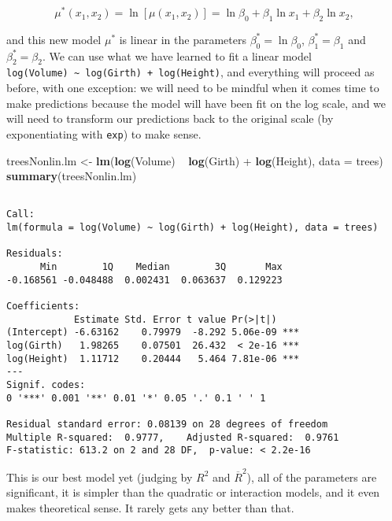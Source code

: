 \documentclass[]{book}
\newenvironment{Shaded}{\begin{snugshade}}{\end{snugshade}}
\newcommand{\KeywordTok}[1]{\textcolor[rgb]{0.13,0.29,0.53}{\textbf{{#1}}}}
\newcommand{\DataTypeTok}[1]{\textcolor[rgb]{0.13,0.29,0.53}{{#1}}}
\newcommand{\StringTok}[1]{\textcolor[rgb]{0.31,0.60,0.02}{{#1}}}
\newcommand{\NormalTok}[1]{{#1}}
\numberwithin{equation}{chapter}
\numberwithin{figure}{chapter}
\theoremstyle{plain}
\theoremstyle{definition}
\theoremstyle{remark}
\theoremstyle{definition}
\theoremstyle{definition}
\theoremstyle{remark}
\begin{document}
\begin{equation}
\mu^{\ast}(x_{1},x_{2})=\ln\left[\mu(x_{1},x_{2})\right]=\ln\beta_{0}+\beta_{1}\ln x_{1}+\beta_{2}\ln x_{2},
\end{equation}

and this new model \(\mu^{\ast}\) is linear in the parameters
\(\beta_{0}^{\ast}=\ln\beta_{0}\), \(\beta_{1}^{\ast}=\beta_{1}\) and
\(\beta_{2}^{\ast}=\beta_{2}\). We can use what we have learned to fit a
linear model
\texttt{log(Volume)\ \textasciitilde{}\ log(Girth)\ +\ log(Height)}, and
everything will proceed as before, with one exception: we will need to
be mindful when it comes time to make predictions because the model will
have been fit on the log scale, and we will need to transform our
predictions back to the original scale (by exponentiating with
\texttt{exp}) to make sense.

\begin{Shaded}
\begin{Highlighting}[]
\NormalTok{treesNonlin.lm <-}\StringTok{ }\KeywordTok{lm}\NormalTok{(}\KeywordTok{log}\NormalTok{(Volume) ~}\StringTok{ }\KeywordTok{log}\NormalTok{(Girth) +}\StringTok{ }
\StringTok{                       }\KeywordTok{log}\NormalTok{(Height), }\DataTypeTok{data =} \NormalTok{trees)}
\KeywordTok{summary}\NormalTok{(treesNonlin.lm)}
\end{Highlighting}
\end{Shaded}

\begin{verbatim}

Call:
lm(formula = log(Volume) ~ log(Girth) + log(Height), data = trees)

Residuals:
      Min        1Q    Median        3Q       Max 
-0.168561 -0.048488  0.002431  0.063637  0.129223 

Coefficients:
            Estimate Std. Error t value Pr(>|t|)    
(Intercept) -6.63162    0.79979  -8.292 5.06e-09 ***
log(Girth)   1.98265    0.07501  26.432  < 2e-16 ***
log(Height)  1.11712    0.20444   5.464 7.81e-06 ***
---
Signif. codes:  
0 '***' 0.001 '**' 0.01 '*' 0.05 '.' 0.1 ' ' 1

Residual standard error: 0.08139 on 28 degrees of freedom
Multiple R-squared:  0.9777,    Adjusted R-squared:  0.9761 
F-statistic: 613.2 on 2 and 28 DF,  p-value: < 2.2e-16
\end{verbatim}

This is our best model yet (judging by \(R^{2}\) and
\(\overline{R}^{2}\)), all of the parameters are significant, it is
simpler than the quadratic or interaction models, and it even makes
theoretical sense. It rarely gets any better than that.
\end{document}
